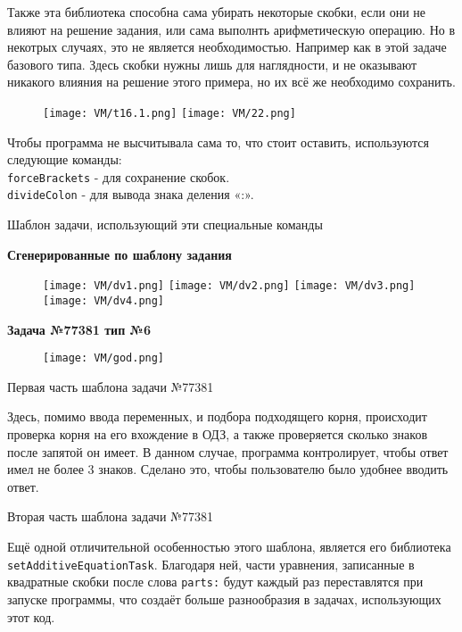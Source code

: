 Также эта библиотека способна сама убирать некоторые скобки, если они не влияют на решение задания, или сама выполнть арифметическую операцию. Но в некотрых случаях, это не является необходимостью. Например как в этой задаче базового типа. Здесь скобки нужны лишь для наглядности, и не оказывают никакого влияния на решение этого примера, но их всё же необходимо сохранить.

\begin{figure}[h]
		\centering
		\texttt{[image: VM/t16.1.png]}
		\texttt{[image: VM/22.png]}
\end{figure}

 Чтобы программа не высчитывала сама то, что стоит оставить, используются следующие команды:
\\ \texttt{forceBrackets} - для сохранение скобок.
\\ \texttt{divideColon} - для вывода знака деления «:».

Шаблон задачи, использующий эти специальные команды



\textbf{Сгенерированные по шаблону задания}

		\begin{figure}[h]
		\centering
		\texttt{[image: VM/dv1.png]}
		\texttt{[image: VM/dv2.png]}
		\texttt{[image: VM/dv3.png]}
		\texttt{[image: VM/dv4.png]}
\end{figure}

\textbf{Задача №77381 тип №6}

\begin{figure}[h]
	\centering
	\texttt{[image: VM/god.png]}
\end{figure}

Первая часть шаблона задачи №77381
 
Здесь, помимо ввода переменных, и подбора подходящего корня, происходит проверка корня на его вхождение в ОДЗ, а также проверяется сколько знаков после запятой он имеет. В данном случае, программа контролирует, чтобы ответ имел не более 3 знаков. Сделано это, чтобы пользователю было удобнее вводить ответ.



Вторая часть шаблона задачи №77381

Ещё одной отличительной особенностью этого шаблона, является его библиотека \texttt{setAdditiveEquationTask}. Благодаря ней, части уравнения, записанные в квадратные скобки после слова \texttt{parts:} будут каждый раз переставлятся при запуске программы, что создаёт больше разнообразия в задачах, использующих этот код.

